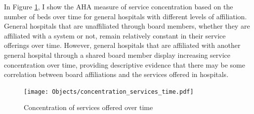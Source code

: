 \documentclass[12pt]{article}
\begin{document}
    In Figure \ref{fig:concentration_services_time}, I show the AHA measure of service concentration based on the number of beds over time for general hospitals with different levels of affiliation. General hospitals that are unaffiliated through board members, whether they are affiliated with a system or not, remain relatively constant in their service offerings over time. However, general hospitals that are affiliated with another general hospital through a shared board member display increasing service concentration over time, providing descriptive evidence that there may be some correlation between board affiliations and the services offered in hospitals.  

    \begin{figure}[ht!]
        \centering
        \caption{Concentration of services offered over time}
        \texttt{[image: Objects/concentration\_services\_time.pdf]}
        \label{fig:concentration_services_time}
    \end{figure}


  

    \newpage


    \printbibliography


    

    

    

    

    

	
	
	
\end{document}
